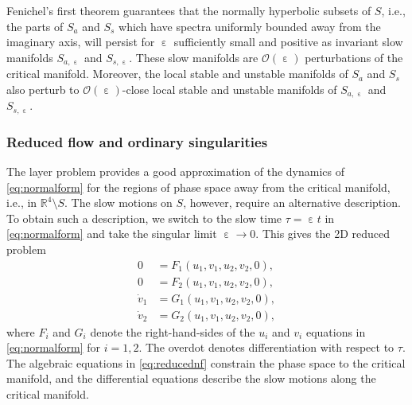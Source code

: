 \documentclass[10pt,onecolumn]{article}
\theoremstyle{plain}
\DeclareMathOperator{\eps}{\varepsilon}
\begin{document}
Fenichel's first theorem \cite{Fenichel1979,Jones1995} guarantees that the normally hyperbolic subsets of $S$, i.e., the parts of $S_a$ and $S_s$ which have spectra uniformly bounded away from the imaginary axis, will persist for $\eps$ sufficiently small and positive as invariant slow manifolds $S_{a,\eps}$ and $S_{s,\eps}$. These slow manifolds are $\mathcal O(\eps)$ perturbations of the critical manifold. Moreover, the local stable and unstable manifolds of $S_a$ and $S_s$ also perturb to $\mathcal O(\eps)$-close local stable and unstable manifolds of $S_{a,\eps}$ and $S_{s,\eps}$.

\subsubsection{Reduced flow and ordinary singularities}
The layer problem provides a good approximation of the dynamics of \eqref{eq:normalform} for the regions of phase space away from the critical manifold, i.e., in $\mathbb R^4 \setminus S$. The slow motions on $S$, however, require an alternative description. To obtain such a description, we switch to the slow time $\tau = \eps t$ in \eqref{eq:normalform} and take the singular limit $\eps \to 0$. This gives the 2D reduced problem
%
\begin{equation} \label{eq:reducednf}
  \begin{split}
    0 &= F_1(u_1,v_1,u_2,v_2,0), \\ 
    0 &= F_2(u_1,v_1,u_2,v_2,0), \\ 
    \dot v_1 &= G_1(u_1,v_1,u_2,v_2,0), \\ 
    \dot v_2 &= G_2(u_1,v_1,u_2,v_2,0),
  \end{split}
\end{equation}
%
where $F_i$ and $G_i$ denote the right-hand-sides of the $u_i$ and $v_i$ equations in \eqref{eq:normalform} for $i=1,2$. The overdot denotes differentiation with respect to $\tau$.
The algebraic equations in \eqref{eq:reducednf} constrain the phase space to the critical manifold, and the differential equations describe the slow motions along the critical manifold. 
\end{document}
